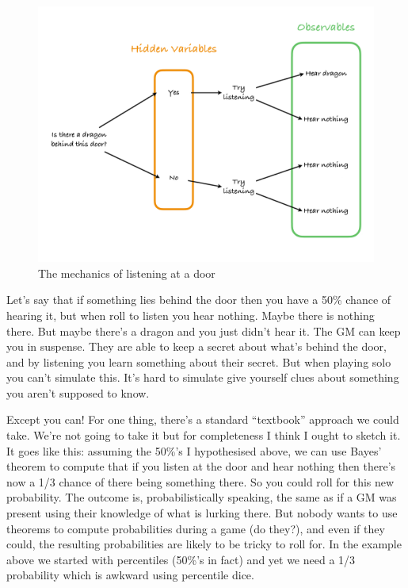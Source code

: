 \documentclass[12pt]{article}
\begin{document}
\begin{figure}
\label{tree1}
\begin{center}
\includegraphics[width=5in]{media/Tree1.pdf}
\caption{The mechanics of listening at a door}
\end{center}
\end{figure}

Let's say that if something
lies behind the door then you have a 50\% chance of hearing it, but when
roll to listen you hear nothing. Maybe there is nothing there. But maybe
there's a dragon and you just didn't hear it. The GM can keep
you in suspense. They are able to keep a secret about what's behind the
door, and by listening you learn something about their secret.
But when playing solo you can't simulate
this. It's hard to simulate give yourself clues about something
you aren't supposed to know.

Except you can! For one thing, there's a standard ``textbook'' approach
we could take. We're not going to take it but for completeness I think I
ought to sketch it. It goes like this:
assuming the 50\%'s I hypothesised above, we can use Bayes' theorem
to compute that if you listen at the door and hear nothing then there's
now a 1/3 chance of there being something there. So you could roll for
this new probability. The outcome is, probabilistically speaking, the
same as if a GM was present using their knowledge of what is lurking
there. But nobody wants to use theorems to compute probabilities during
a game (do they?), and even if they could, the resulting probabilities
are likely to be tricky to roll for. In the example above we started
with percentiles (50\%'s in fact) and yet we need a 1/3 probability
which is awkward using percentile dice.
\end{document}
